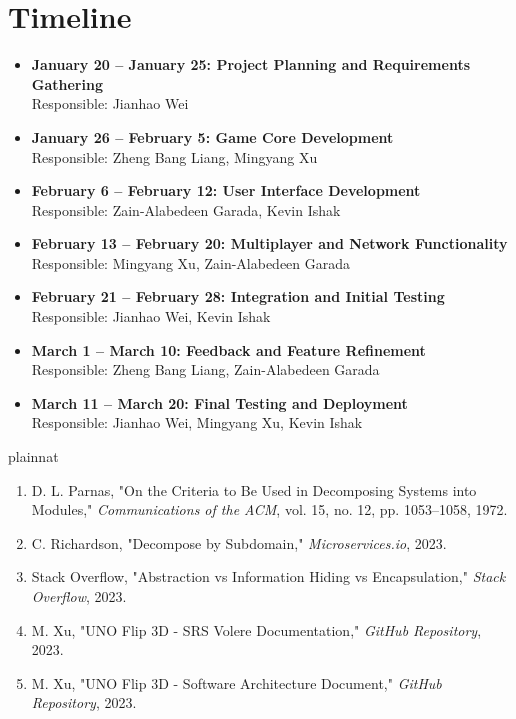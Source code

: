 \documentclass[12pt, titlepage]{article}
\begin{document}
\section{Timeline}



\begin{itemize}
    \item \textbf{January 20 – January 25: Project Planning and Requirements Gathering} \\
    Responsible: Jianhao Wei
    \item \textbf{January 26 – February 5: Game Core Development} \\
    Responsible: Zheng Bang Liang, Mingyang Xu
    \item \textbf{February 6 – February 12: User Interface Development} \\
    Responsible: Zain-Alabedeen Garada, Kevin Ishak
    \item \textbf{February 13 – February 20: Multiplayer and Network Functionality} \\
    Responsible: Mingyang Xu, Zain-Alabedeen Garada
    \item \textbf{February 21 – February 28: Integration and Initial Testing} \\
    Responsible: Jianhao Wei, Kevin Ishak
    \item \textbf{March 1 – March 10: Feedback and Feature Refinement} \\
    Responsible: Zheng Bang Liang, Zain-Alabedeen Garada
    \item \textbf{March 11 – March 20: Final Testing and Deployment} \\
    Responsible: Jianhao Wei, Mingyang Xu, Kevin Ishak
\end{itemize}


 {plainnat}

\begin{enumerate}
    \item D. L. Parnas, "On the Criteria to Be Used in Decomposing Systems into Modules," \textit{Communications of the ACM}, vol. 15, no. 12, pp. 1053--1058, 1972.
    \item C. Richardson, "Decompose by Subdomain," \textit{Microservices.io}, 2023.
    \item Stack Overflow, "Abstraction vs Information Hiding vs Encapsulation," \textit{Stack Overflow}, 2023.
    \item M. Xu, "UNO Flip 3D - SRS Volere Documentation," \textit{GitHub Repository}, 2023.
    \item M. Xu, "UNO Flip 3D - Software Architecture Document," \textit{GitHub Repository}, 2023.
\end{enumerate}

\newpage{}
\end{document}
